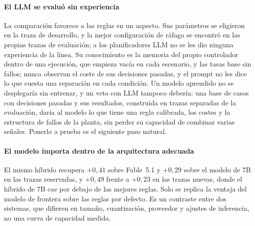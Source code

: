 \documentclass[preprint,11pt]{elsarticle}
\begin{document}
\paragraph{El LLM se evaluó sin experiencia}
La comparación favorece a las reglas en un aspecto. Sus parámetros se eligieron en la traza de desarrollo, y la mejor configuración de ráfaga se encontró en las propias trazas de evaluación; a los planificadores LLM no se les dio ninguna experiencia de la línea. Su conocimiento es la memoria del propio controlador dentro de una ejecución, que empieza vacía en cada escenario, y las tasas base sin fallos; nunca observan el coste de sus decisiones pasadas, y el prompt no les dice lo que cuesta una reparación en cada condición. Un modelo aprendido no se desplegaría sin entrenar, y un veto con LLM tampoco debería: una base de casos con decisiones pasadas y sus resultados, construida en trazas separadas de la evaluación, daría al modelo lo que tiene una regla calibrada, los costes y la estructura de fallos de la planta, sin perder su capacidad de combinar varias señales. Ponerlo a prueba es el siguiente paso natural.

\paragraph{El modelo importa dentro de la arquitectura adecuada}
El mismo híbrido recupera $+0{,}41$ sobre Fable~5.1 y $+0{,}29$ sobre el modelo de 7B en las trazas reservadas, y $+0{,}49$ frente a $+0{,}23$ en las trazas nuevas, donde el híbrido de 7B cae por debajo de las mejores reglas. Solo se replica la ventaja del modelo de frontera sobre las reglas por defecto. Es un contraste entre dos sistemas, que difieren en tamaño, cuantización, proveedor y ajustes de inferencia, no una curva de capacidad medida.
\end{document}
